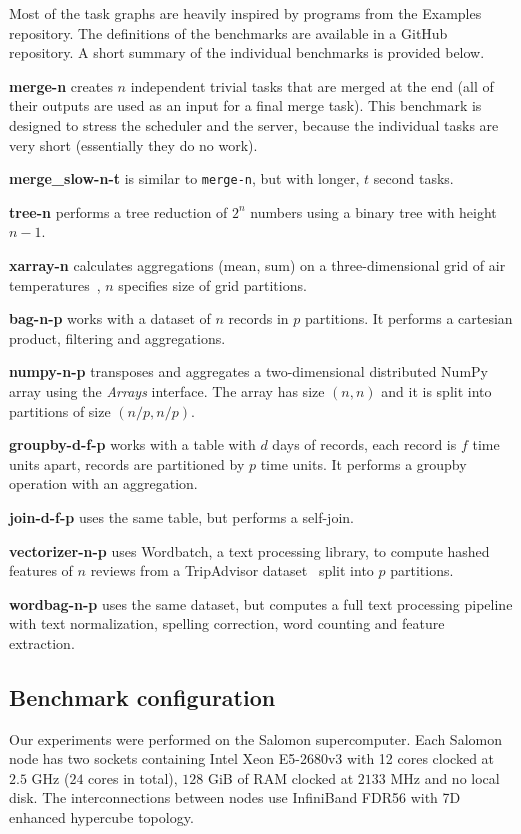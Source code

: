 Most of the task graphs are heavily inspired by programs from the \dask{}
Examples repository. The definitions of the benchmarks are available in
a GitHub repository. A short summary of the individual benchmarks is
provided below.

\noindent\textbf{merge-n} creates $n$ independent trivial tasks
that are merged at the end (all of their outputs are used as an input for a final merge task). This
benchmark is designed to stress the scheduler and the server, because the individual tasks are very
short (essentially they do no work).

\noindent\textbf{merge\_slow-n-t} is similar to \texttt{merge-n}, but with longer,
$t$ second tasks.

\noindent\textbf{tree-n} performs a tree reduction of $2^n$
numbers using a binary tree with height $n-1$.

\noindent\textbf{xarray-n} calculates aggregations (mean, sum) on a
three-dimensional grid of air temperatures~\cite{airdataset}, $n$
specifies size of grid partitions.

\noindent\textbf{bag-n-p} works with a dataset of $n$ records in
$p$ partitions. It performs a cartesian product, filtering and aggregations.

\noindent\textbf{numpy-n-p} transposes and aggregates a two-dimensional
distributed NumPy array using the \emph{Arrays} interface. The array has size
$(n,n)$ and it is split into partitions of size $(n/p,n/p)$.

\noindent\textbf{groupby-d-f-p} works with a table with $d$ days of
records, each record is $f$ time units apart, records are partitioned by
$p$ time units. It performs a groupby operation with an aggregation.

\noindent\textbf{join-d-f-p} uses the same table, but performs a self-join.

\noindent\textbf{vectorizer-n-p} uses
Wordbatch, a text processing library, to compute hashed features of
$n$ reviews from a TripAdvisor dataset~\cite{wordbatcharticle} split
into $p$ partitions.

\noindent\textbf{wordbag-n-p} uses the same dataset, but computes a full text processing
pipeline with text normalization, spelling correction, word counting and feature extraction.

\subsection*{Benchmark configuration}
Our experiments were performed on the Salomon supercomputer. Each
Salomon node has two sockets containing Intel Xeon E5-2680v3 with 12 cores clocked at
$2.5$ GHz ($24$ cores in total),
$128$ GiB of RAM clocked at $2133$ MHz and no local disk.
The interconnections between nodes use InfiniBand FDR56 with 7D enhanced hypercube topology.

